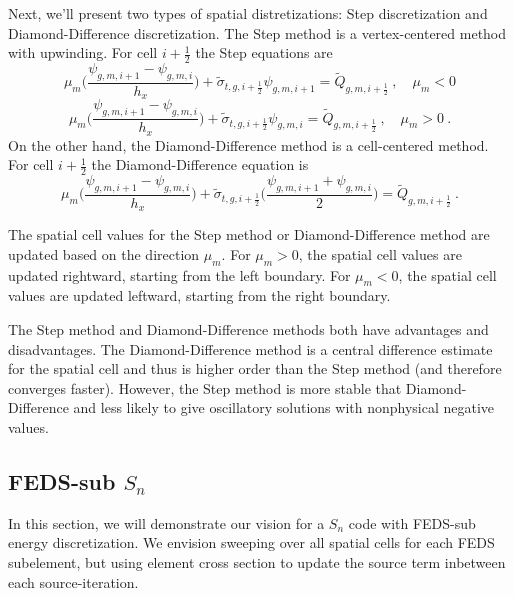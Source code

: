 \documentclass{article}
\begin{document}
Next, we'll present two types of spatial distretizations: Step discretization and Diamond-Difference discretization. The Step method is a vertex-centered method with upwinding. For cell $i+\frac{1}{2}$ the Step equations are
\begin{equation*}
\mu_m \Big( \frac{\psi_{g,m,i+1} - \psi_{g,m,i}}{h_x} \Big) +  \tilde{\sigma}_{t,g,i+\frac{1}{2}} \psi_{g,m,i+1} =  \tilde{Q}_{g,m,i+\frac{1}{2}} \:, \quad \mu_m < 0
\end{equation*} 
\begin{equation*}
\mu_m \Big( \frac{\psi_{g,m,i+1} - \psi_{g,m,i}}{h_x} \Big) + \tilde{\sigma}_{t,g,i+\frac{1}{2}} \psi_{g,m,i} =   \tilde{Q}_{g,m,i+\frac{1}{2}}  \:, \quad \mu_m > 0 \: .
\end{equation*}
On the other hand, the Diamond-Difference method is a cell-centered method. For cell $i+\frac{1}{2}$ the Diamond-Difference equation is
\begin{equation*}
\mu_m \Big( \frac{\psi_{g,m,i+1} - \psi_{g,m,i}}{h_x} \Big) +  \tilde{\sigma}_{t,g,i+\frac{1}{2}} \Big( \frac{\psi_{g,m,i+1} + \psi_{g,m,i}}{2} \Big) =  \tilde{Q}_{g,m,i+\frac{1}{2}} \: .
\end{equation*} 

The spatial cell values for the Step method or Diamond-Difference method are updated based on the direction $\mu_m$. For $\mu_m > 0$, the spatial cell values are updated rightward, starting from the left boundary. For $\mu_m < 0$, the spatial cell values are updated leftward, starting from the right boundary. 

The Step method and Diamond-Difference methods both have advantages and disadvantages. The Diamond-Difference method is a central difference estimate for the spatial cell and thus is higher order than the Step method (and therefore converges faster). However, the Step method is more stable that Diamond-Difference and less likely to give oscillatory solutions with nonphysical negative values. 

\pagebreak

\subsection{FEDS-sub $S_n$}

In this section, we will demonstrate our vision for a $S_n$ code with FEDS-sub energy discretization. We envision sweeping over all spatial cells for each FEDS subelement, but using element cross section to update the source term inbetween each source-iteration.  
\end{document}
